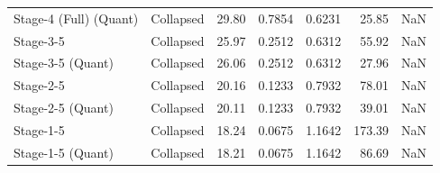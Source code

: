 \begin{table}
\begin{tabular}{llrrrrl}
Stage-4 (Full)
(Quant) & Collapsed & 29.80 & 0.7854 & 0.6231 & 25.85 & NaN \\
Stage-3-5 & Collapsed & 25.97 & 0.2512 & 0.6312 & 55.92 & NaN \\
Stage-3-5
(Quant) & Collapsed & 26.06 & 0.2512 & 0.6312 & 27.96 & NaN \\
Stage-2-5 & Collapsed & 20.16 & 0.1233 & 0.7932 & 78.01 & NaN \\
Stage-2-5
(Quant) & Collapsed & 20.11 & 0.1233 & 0.7932 & 39.01 & NaN \\
Stage-1-5 & Collapsed & 18.24 & 0.0675 & 1.1642 & 173.39 & NaN \\
Stage-1-5
(Quant) & Collapsed & 18.21 & 0.0675 & 1.1642 & 86.69 & NaN \\
\bottomrule
\end{tabular}
\end{table}

